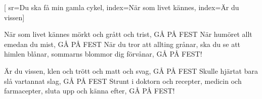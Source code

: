 [ 							
	sr={Du ska få min gamla cykel},					
	index={När som livet kännes},
	index={Är du vissen}]		
	
\beginverse*						
När som livet kännes mörkt och grått och trist,
GÅ PÅ FEST
När humöret allt emedan du mist,
GÅ PÅ FEST
När du tror att allting grånar, 
ska du se att himlen blånar, 
sommarns blommor dig förvånar, 
GÅ PÅ FEST!
\endverse						

\beginverse				
Är du vissen, klen och trött och matt och svag, 
GÅ PÅ FEST
Skulle hjärtat bara slå vartannat slag, 
GÅ PÅ FEST
Strunt i doktorn och recepter, 
medicin och farmacepter, 
sluta upp och känna efter, 
GÅ PÅ FEST!
\endverse				
\endsong